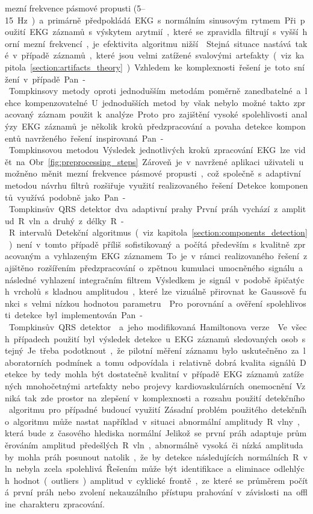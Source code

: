 mezní frekvence pásmové propusti (5--15~\si\Hz) a primárně předpokládá EKG s
normálním sinusovým rytmem. Při použití EKG záznamů s výskytem arytmií, které se
zpravidla filtrují s vyšší horní mezní frekvencí, je efektivita algoritmu
nižší~\cite{Fariha2020}. Stejná situace nastává také v případě záznamů, které
jsou velmi zatížené svalovými artefakty (viz
kapitola~\ref{section:artifacts_theory}). Vzhledem ke komplexnosti řešení je
toto snížení v případě Pan-Tompkinsovy metody oproti jednodušším metodám poměrně
zanedbatelné a lehce kompenzovatelné. U jednodušších metod by však nebylo možné
takto zpracovaný záznam použit k analýze. Proto pro zajištění vysoké
spolehlivosti analýzy EKG záznamů je několik kroků předzpracování a povaha
detekce komponentů navrženého řešení inspirovaná Pan-Tompkinsovou metodou.
Výsledek jednotlivých kroků zpracování EKG lze vidět na
Obr.~\ref{fig:preprocessing_steps}. Zároveň je v navržené aplikaci uživateli
umožněno měnit mezní frekvence pásmové propusti, což společně s adaptivní
metodou návrhu filtrů rozšiřuje využití realizovaného řešení.

Detekce komponentů využívá podobně jako Pan-Tompkinsův QRS detektor dva
adaptivní prahy. První práh vychází z amplitud R vln a druhý z délky R-R
intervalů. Detekční algoritmus (viz kapitola~\ref{section:components_detection})
není v tomto případě příliš sofistikovaný a počítá především s kvalitně
zpracovaným a vyhlazeným EKG záznamem. To je v rámci realizovaného řešení
zajištěno rozšířením předzpracování o zpětnou kumulaci umocněného signálu a
následné vyhlazení integračním filtrem. Výsledkem je signál v podobě špičatých
vrcholů s kladnou amplitudou, které lze vizuálně přirovnat ke Gaussově funkci s
velmi nízkou hodnotou parametru~\textsigma. Pro porovnání a ověření
spolehlivosti detekce byl implementován Pan-Tompkinsův QRS
detektor~\cite{Pan1985} a jeho modifikovaná Hamiltonova
verze~\cite{Hamilton1987}. Ve všech případech použití byl výsledek detekce u EKG
záznamů sledovaných osob stejný. Je třeba podotknout, že pilotní měření záznamu
bylo uskutečněno za laboratorních podmínek a tomu odpovídala i relativně dobrá
kvalita signálů. Detekce by tedy mohla být dostatečně kvalitní v případě EKG záznamů
zatížených mnohočetnými artefakty nebo projevy kardiovaskulárních onemocnění.
Vzniká tak zde prostor na zlepšení v komplexnosti a rozsahu použití detekčního
algoritmu pro případné budoucí využití. Zásadní problém použitého detekčního
algoritmu může nastat například v situaci abnormální amplitudy R vlny, která
bude z časového hlediska normální. Jelikož se první práh adaptuje průměrováním
amplitud předešlých R vln, abnormálně vysoká či nízká amplituda by mohla práh
posunout natolik, že by detekce následujících normálních R vln nebyla zcela spolehlivá.
Řešením může být identifikace a eliminace odlehlých hodnot (outliers)
amplitud v cyklické frontě, ze které se průměrem počítá první práh nebo zvolení
nekauzálního přístupu prahování v závislosti na offline charakteru zpracování.

